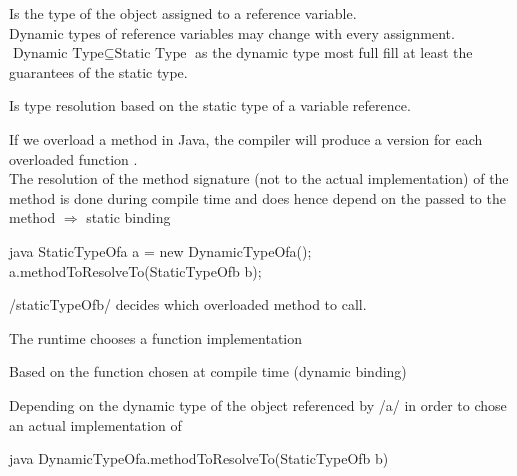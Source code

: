 \begin{defnbox}\nospacing
  \begin{defn}\label{defn:dynamicType}
    Is the type of the object assigned to a reference variable.\\
    Dynamic types of reference variables may change with every assignment.\\
    $\text{Dynamic Type}\subseteq\text{Static Type}$ as the dynamic type most
    full fill at least the guarantees of the static type.
  \end{defn}
\end{defnbox}
\begin{defnbox}\nospacing
  \begin{defn}
    Is type resolution based on the static type of a variable reference.
  \end{defn}
\end{defnbox}
\begin{defnbox}\nospacing
  \begin{defn}
    If we overload a method in Java, the compiler will produce a version for
    each overloaded function .\\
    The resolution of the method signature (not to the actual implementation) of the
    method is done during compile time and does hence depend on the 
    passed to the method $\Rightarrow$ static binding
    \begin{mintlinebox}{java}
      StaticTypeOfa a = new DynamicTypeOfa();
      a.methodToResolveTo(StaticTypeOfb b);
    \end{mintlinebox}
    \javainline/staticTypeOfb/ decides which overloaded method to call.
  \end{defn}
\end{defnbox}
\begin{defnbox}\nospacing
  \begin{defn}
    The runtime chooses a function implementation
    \begin{numberlistnosep}
        \item Based on the function  chosen at compile time
      (dynamic binding)
        \item Depending on the dynamic type of the object referenced by
      \javainline/a/ in order to chose an actual implementation of
      \begin{mintlinebox}{java}
          DynamicTypeOfa.methodToResolveTo(StaticTypeOfb b)
      \end{mintlinebox}
    \end{numberlistnosep}
  \end{defn}
\end{defnbox}
